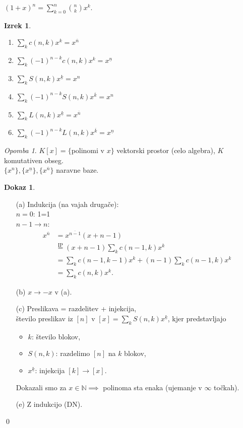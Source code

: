 \documentclass[a4paper, 12pt]{book}
\theoremstyle{definition}
\newtheorem{theorem}[counter]{Izrek}
\newtheorem{pro}[counter]{Dokaz}
\theoremstyle{remark}
\newtheorem*{rem}{Opomba}
\newcommand{\N}{\mathbb{N}}
\begin{document}
$(1+x)^n = \sum_{k=0}^{n} \binom{n}{k} x^k$.
\begin{theorem} \text{}
  \begin{enumerate}[label={(\alph*)}]
    \item $\sum_k c(n,k) x^k = x^{\overline{n}}$
    \item $\sum_k (-1)^{n-k} c(n,k) x^k = x^{\underline{n}}$
    \item $\sum_k S(n,k) x^{\underline{k}} = x^{n}$
    \item $\sum_k (-1)^{n-k} S(n,k) x^{\overline{k}} = x^{n}$
    \item $\sum_k L(n,k) x^{\underline{k}} = x^{\overline{n}}$
    \item $\sum_k (-1)^{n-k} L(n,k) x^{\overline{k}} = x^{\underline{n}}$
  \end{enumerate}
\end{theorem}
\begin{rem}
  $K[x] = \{$polinomi v $x\}$ vektorski prostor (celo algebra), $K$ komutativen obseg. \\
  $\{x^n\}, \{x^{\underline{n}}\}, \{x^{\overline{n}}\}$ naravne baze.
\end{rem}
\begin{pro} \text{}
  \begin{enumerate}
    \item[(a)] Indukcija (na vajah drugače): \\
      $n=0$: 1=1 \\
      $n-1\to n$:
        \begin{align*}
          x^{\overline{n}} &= x^{\overline{n-1}}(x+n-1) \\
          &\stackrel{\text{IP}}{=} (x+n-1) \sum_k c(n-1,k) x^k \\
          &= \sum_k c(n-1,k-1) x^k + (n-1) \sum_k c(n-1,k) x^k \\
          &= \sum_k c(n,k) x^k.
        \end{align*}
    \item[(b)] $x \to -x$ v (a).
    \item[(c)] Preslikava = razdelitev + injekcija, \\
      število preslikav iz $[n]$ v $[x] = \sum_k S(n,k) x^{\underline{k}}$, kjer predstavljajo
      \begin{itemize}
        \item $k$: število blokov,
        \item $S(n,k)$: razdelimo $[n]$ na $k$ blokov,
        \item $x^{\underline{k}}$: injekcija $[k] \to [x]$.
      \end{itemize}
      Dokazali smo za $x \in \N \implies$ polinoma sta enaka (ujemanje v $\infty$ točkah).
    \item[(e)] Z indukcijo (DN).
  \end{enumerate}
  \qed
\end{pro}
\end{document}
